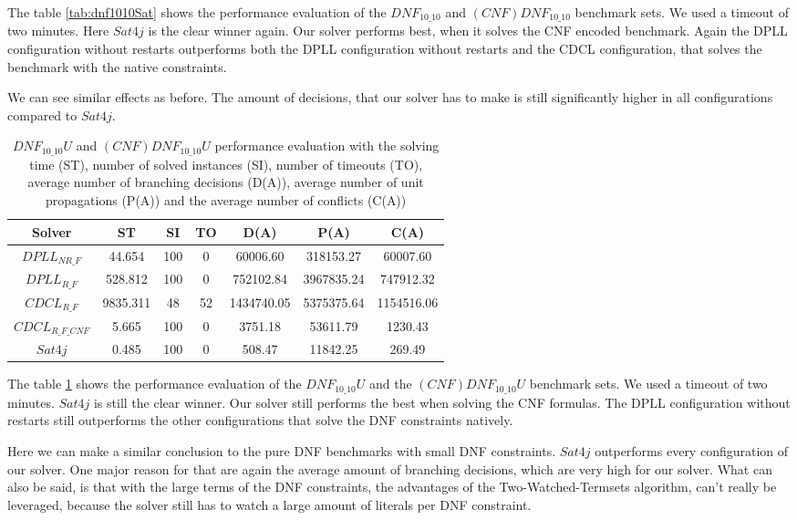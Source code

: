 The table \ref{tab:dnf1010Sat} shows the performance evaluation of the $DNF_{10\_10}$ and $(CNF)DNF_{10\_10}$ benchmark sets. We used a timeout of two minutes. Here $Sat4j$ is the clear winner again. Our solver performs best, when it solves the CNF encoded benchmark. Again the DPLL configuration without restarts outperforms both the DPLL configuration without restarts and the CDCL configuration, that solves the benchmark with the native constraints.

We can see similar effects as before. The amount of decisions, that our solver has to make is still significantly higher in all configurations compared to $Sat4j$.

\begin{table}[!htb]
\centering
\caption[$DNF_{10\_10}U$ and $(CNF)DNF_{10\_10}U$ performance evaluation]{$DNF_{10\_10}U$ and $(CNF)DNF_{10\_10}U$ performance evaluation with the solving time (ST), number of solved instances (SI), number of timeouts (TO), average number of branching decisions (D(A)), average number of unit propagations (P(A)) and the average number of conflicts (C(A))}
\label{tab:dnf1010Unsat}
\begin{tabular}{|c|c|c|c|c|c|c|}
\hline
Solver & ST & SI & TO & D(A) & P(A) & C(A)\\ 
\hline
$DPLL_{NR\_F}$ & 44.654 & 100 & 0 & 60006.60 & 318153.27 & 60007.60 \\ 
\hline
$DPLL_{R\_F}$ & 528.812 & 100 & 0 & 752102.84 & 3967835.24 & 747912.32 \\ 
\hline
$CDCL_{R\_F}$ & 9835.311 & 48 & 52 & 1434740.05 & 5375375.64 & 1154516.06 \\ 
\hline
$CDCL_{R\_F\_CNF}$ & 5.665 & 100 & 0 & 3751.18 & 53611.79 & 1230.43 \\ 
\hline
$Sat4j$ & 0.485 & 100 & 0 & 508.47 & 11842.25 & 269.49 \\ 
\hline
\end{tabular}
\end{table}

The table \ref{tab:dnf1010Unsat} shows the performance evaluation of the $DNF_{10\_10}U$ and the $(CNF)DNF_{10\_10}U$ benchmark sets. We used a timeout of two minutes. $Sat4j$ is still the clear winner. Our solver still performs the best when solving the CNF formulas. The DPLL configuration without restarts still outperforms the other configurations that solve the DNF constraints natively.

Here we can make a similar conclusion to the pure DNF benchmarks with small DNF constraints. $Sat4j$ outperforms every configuration of our solver. One major reason for that are again the average amount of branching decisions, which are very high for our solver. What can also be said, is that with the large terms of the DNF constraints, the advantages of the Two-Watched-Termsets algorithm, can't really be leveraged, because the solver still has to watch a large amount of literals per DNF constraint.

